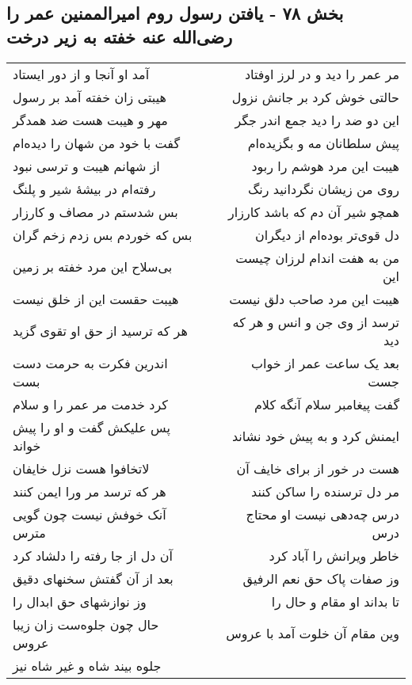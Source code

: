 \begin{center}
\section*{بخش ۷۸ - یافتن رسول روم امیرالممنین عمر را رضی‌الله عنه خفته به زیر درخت}
\label{sec:sh078}
\begin{longtable}{l p{0.5cm} r}
آمد او آنجا و از دور ایستاد
&&
مر عمر را دید و در لرز اوفتاد
\\
هیبتی زان خفته آمد بر رسول
&&
حالتی خوش کرد بر جانش نزول
\\
مهر و هیبت هست ضد همدگر
&&
این دو ضد را دید جمع اندر جگر
\\
گفت با خود من شهان را دیده‌ام
&&
پیش سلطانان مه و بگزیده‌ام
\\
از شهانم هیبت و ترسی نبود
&&
هیبت این مرد هوشم را ربود
\\
رفته‌ام در بیشهٔ شیر و پلنگ
&&
روی من زیشان نگردانید رنگ
\\
بس شدستم در مصاف و کارزار
&&
همچو شیر آن دم که باشد کارزار
\\
بس که خوردم بس زدم زخم گران
&&
دل قوی‌تر بوده‌ام از دیگران
\\
بی‌سلاح این مرد خفته بر زمین
&&
من به هفت اندام لرزان چیست این
\\
هیبت حقست این از خلق نیست
&&
هیبت این مرد صاحب دلق نیست
\\
هر که ترسید از حق او تقوی گزید
&&
ترسد از وی جن و انس و هر که دید
\\
اندرین فکرت به حرمت دست بست
&&
بعد یک ساعت عمر از خواب جست
\\
کرد خدمت مر عمر را و سلام
&&
گفت پیغامبر سلام آنگه کلام
\\
پس علیکش گفت و او را پیش خواند
&&
ایمنش کرد و به پیش خود نشاند
\\
لاتخافوا هست نزل خایفان
&&
هست در خور از برای خایف آن
\\
هر که ترسد مر ورا ایمن کنند
&&
مر دل ترسنده را ساکن کنند
\\
آنک خوفش نیست چون گویی مترس
&&
درس چه‌دهی نیست او محتاج درس
\\
آن دل از جا رفته را دلشاد کرد
&&
خاطر ویرانش را آباد کرد
\\
بعد از آن گفتش سخنهای دقیق
&&
وز صفات پاک حق نعم الرفیق
\\
وز نوازشهای حق ابدال را
&&
تا بداند او مقام و حال را
\\
حال چون جلوه‌ست زان زیبا عروس
&&
وین مقام آن خلوت آمد با عروس
\\
جلوه بیند شاه و غیر شاه نیز
&&

\end{longtable}
\end{center}
